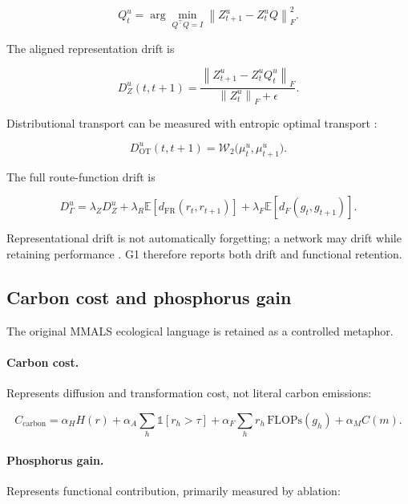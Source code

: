 \documentclass[11pt,a4paper]{article}
\newcommand{\E}{\mathbb{E}}
\newcommand{\W}{\mathcal{W}_2}
\newcommand{\norm}[1]{\left\lVert #1 \right\rVert}
\begin{document}
\begin{equation}
 Q_t^u=\arg\min_{Q^\top Q=I}\norm{Z_{t+1}^u-Z_t^uQ}_F^2.
\end{equation}

The aligned representation drift is

\begin{equation}
 D_Z^u(t,t+1)=\frac{\norm{Z_{t+1}^u-Z_t^uQ_t^u}_F}{\norm{Z_t^u}_F+\epsilon}.
\end{equation}

Distributional transport can be measured with entropic optimal transport \citep{cuturi2013sinkhorn,peyre2019ot}:

\begin{equation}
 D_{\mathrm{OT}}^u(t,t+1)=\W\bigl(\mu_t^u,\mu_{t+1}^u\bigr).
\end{equation}

The full route-function drift is

\begin{equation}
 D_{\Gamma}^u=\lambda_ZD_Z^u+\lambda_R\E[d_{\mathrm{FR}}(r_t,r_{t+1})]
+\lambda_F\E[d_F(g_t,g_{t+1})].
\end{equation}

Representational drift is not automatically forgetting; a network may drift while retaining performance \citep{pashakhanloo2023drift}. G1 therefore reports both drift and functional retention.

\subsection{Carbon cost and phosphorus gain}

The original MMALS ecological language is retained as a controlled metaphor.

\paragraph{Carbon cost.}
Represents diffusion and transformation cost, not literal carbon emissions:

\begin{equation}
 C_{\mathrm{carbon}}=
 \alpha_H H(r)+\alpha_A\sum_h\mathbb{1}[r_h>\tau]
 +\alpha_F\sum_h r_h\,\mathrm{FLOPs}(g_h)
 +\alpha_M C(m).
\end{equation}

\paragraph{Phosphorus gain.}
Represents functional contribution, primarily measured by ablation:
\end{document}
